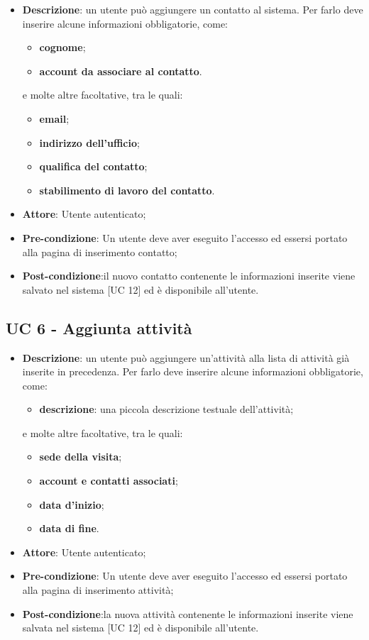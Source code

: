 \begin{itemize}
	\item \textbf{Descrizione}: un utente può aggiungere un contatto al sistema. Per farlo deve inserire alcune informazioni obbligatorie, come:
	\begin{itemize}
		\item \textbf{cognome};
		\item \textbf{account da associare al contatto}.
	\end{itemize}
	e molte altre facoltative, tra le quali:
	\begin{itemize}
		\item \textbf{email};
		\item \textbf{indirizzo dell'ufficio};
		\item \textbf{qualifica del contatto};
		\item \textbf{stabilimento di lavoro del contatto}.
	\end{itemize}
	\item \textbf{Attore}: Utente autenticato;
	\item \textbf{Pre-condizione}: Un utente deve aver eseguito l'accesso ed essersi portato alla pagina di inserimento contatto;
	\item \textbf{Post-condizione}:il nuovo contatto contenente le informazioni inserite viene salvato nel sistema [UC 12] ed è disponibile all'utente.
\end{itemize}

\subsection{UC 6 - Aggiunta attività}

\begin{itemize}
	\item \textbf{Descrizione}: un utente può aggiungere un'attività alla lista di attività già inserite in precedenza. Per farlo deve inserire alcune informazioni obbligatorie, come:
	\begin{itemize}
		\item \textbf{descrizione}: una piccola descrizione testuale dell'attività;
	\end{itemize}
	e molte altre facoltative, tra le quali:
	\begin{itemize}
		\item \textbf{sede della visita};
		\item \textbf{account e contatti associati};
		\item \textbf{data d'inizio};
		\item \textbf{data di fine}.
	\end{itemize}
	\item \textbf{Attore}: Utente autenticato;
	\item \textbf{Pre-condizione}: Un utente deve aver eseguito l'accesso ed essersi portato alla pagina di inserimento attività;
	\item \textbf{Post-condizione}:la nuova attività contenente le informazioni inserite viene salvata nel sistema [UC 12] ed è disponibile all'utente.
\end{itemize}

